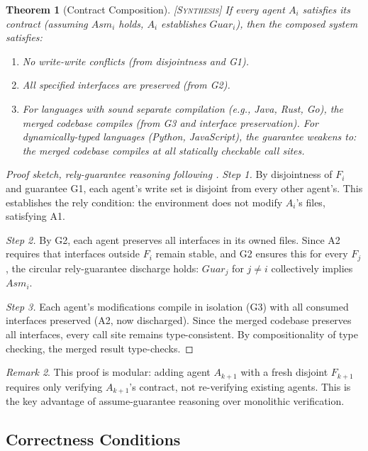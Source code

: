 \documentclass[11pt]{article}
\newtheorem{theorem}{Theorem}[section]
\theoremstyle{definition}
\theoremstyle{remark}
\newtheorem{remark}[theorem]{Remark}
\newcommand{\synthesis}{\textsc{[Synthesis]}}
\begin{document}
\begin{theorem}[Contract Composition] \synthesis{}
\label{thm:composition}
If every agent $A_i$ satisfies its contract (assuming $Asm_i$ holds, $A_i$ establishes $Guar_i$), then the composed system satisfies:
\begin{enumerate}[nosep]
  \item No write-write conflicts (from disjointness and G1).
  \item All specified interfaces are preserved (from G2).
  \item For languages with sound separate compilation (e.g., Java, Rust, Go), the merged codebase compiles (from G3 and interface preservation). For dynamically-typed languages (Python, JavaScript), the guarantee weakens to: the merged codebase compiles at all statically checkable call sites.
\end{enumerate}
\end{theorem}

\begin{proof}[Proof sketch, rely-guarantee reasoning following \citet{Jones1983}]
\textit{Step 1.}
By disjointness of $F_i$ and guarantee G1, each agent's write set is disjoint from every other agent's.
This establishes the rely condition: the environment does not modify $A_i$'s files, satisfying A1.

\textit{Step 2.}
By G2, each agent preserves all interfaces in its owned files.
Since A2 requires that interfaces outside $F_i$ remain stable, and G2 ensures this for every $F_j$, the circular rely-guarantee discharge holds: $Guar_j$ for $j \neq i$ collectively implies $Asm_i$.

\textit{Step 3.}
Each agent's modifications compile in isolation (G3) with all consumed interfaces preserved (A2, now discharged).
Since the merged codebase preserves all interfaces, every call site remains type-consistent.
By compositionality of type checking, the merged result type-checks.
\end{proof}

\begin{remark}
This proof is modular: adding agent $A_{k+1}$ with a fresh disjoint $F_{k+1}$ requires only verifying $A_{k+1}$'s contract, not re-verifying existing agents.
This is the key advantage of assume-guarantee reasoning over monolithic verification.
\end{remark}

\subsection{Correctness Conditions}
\end{document}
